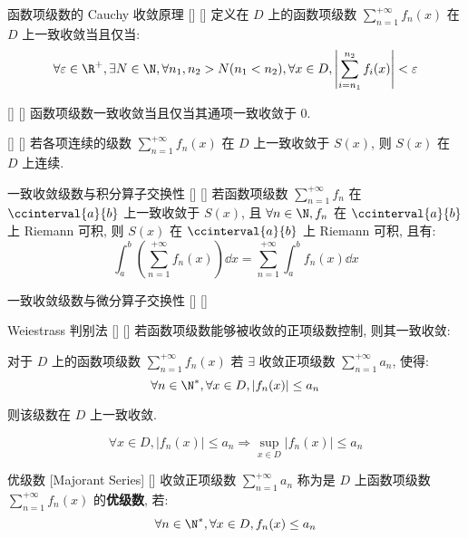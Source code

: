 \documentclass[UTF8]{ctexart}
\begin{document}
			\begin{ppt}
			    []
			    {函数项级数的 Cauchy 收敛原理}
			    []
			    []
				定义在 \(D\) 上的函数项级数 \(\sum\limits_{n=1}^{+\infty}f_n(x)\) 在 \(D\) 上一致收敛当且仅当: 
				\[\forall\varepsilon\in\R^+, \exists N\in\N, \forall n_1,n_2>N(n_1<n_2), \forall x\in D, \left|\sum_{i=n_1}^{n_2}f_i(x)\right|<\varepsilon\]
			\end{ppt}

			\begin{ppt}
			    []
			    {}
			    []
			    []
				函数项级数一致收敛当且仅当其通项一致收敛于 \(0\). 
			\end{ppt}

			\begin{ppt}
			    []
			    {}
			    []
			    []
				若各项连续的级数 \(\sum\limits_{n=1}^{+\infty}f_n(x)\) 在 \(D\) 上一致收敛于 \(S(x)\), 则 \(S(x)\) 在 \(D\) 上连续.	 
			\end{ppt}

			\begin{ppt}
			    []
			    {一致收敛级数与积分算子交换性}
			    []
			    []
				若函数项级数 \(\sum\limits_{n=1}^{+\infty}f_n\) 在 \(\ccinterval{a}{b}\) 上一致收敛于 \(S(x)\), 且 \(\forall n\in\N, f_n\) 在 \(\ccinterval{a}{b}\) 上 Riemann 可积, 则 \(S(x)\) 在 \(\ccinterval{a}{b}\) 上 Riemann 可积, 且有: 
				\[\int_a^b\left(\sum_{n=1}^{+\infty}f_n(x)\right)\dd x=\sum_{n=1}^{+\infty}\int_a^b f_n(x)\dd x\]
			\end{ppt}

			\begin{ppt}
			    []
			    {一致收敛级数与微分算子交换性}
			    []
			    []
			\end{ppt}

			\begin{thm}
			    []
			    {Weiestrass 判别法}
			    []
			    []
				若函数项级数能够被收敛的正项级数控制, 则其一致收敛: 
				
				对于 \(D\) 上的函数项级数 \(\sum\limits_{n=1}^{+\infty}f_n(x)\) 若 \(\exists\) 收敛正项级数 \(\sum\limits_{n=1}^{+\infty}a_n\), 使得: 
				\[\forall n\in\N^*, \forall x\in D, |f_n(x)|\leq a_n\]

				则该级数在 \(D\) 上一致收敛. 
			\end{thm}

			\begin{prf}
				\[\forall x\in D, |f_n(x)|\leq a_n\Longrightarrow\sup_{x\in D}|f_n(x)|\leq a_n\]
			\end{prf}

			\begin{dfn}
			    []
			    {优级数 }
			    [Majorant Series]
			    []
				收敛正项级数 \(\sum\limits_{n=1}^{+\infty}a_n\) 称为是 \(D\) 上函数项级数 \(\sum\limits_{n=1}^{+\infty}f_n(x)\) 的\textbf{优级数}, 若: 
				\[\forall n\in\N^*, \forall x\in D, f_n(x)\leq a_n\]
			\end{dfn}
\end{document}
